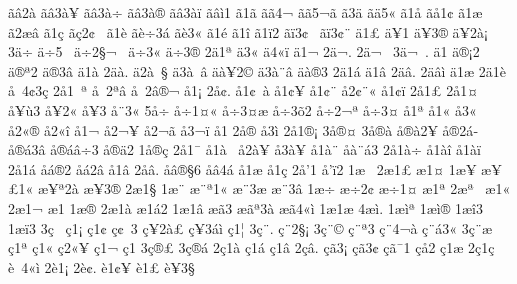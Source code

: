 {^^e3^^e22^^e0
^^e3^^e23^^e0^^a5
^^e3^^e23^^e0^^f7
^^e3^^e23^^e0^^ae
^^e3^^e23^^e0^^ef
^^e3^^e2^^ec1
^^e31^^e3
^^e3^^e34^^ac^^ad
^^e3^^e35^^ac^^e3
^^e33^^e4
^^e3^^e45^^ab
^^e31^^e5
^^e3^^e51^^a2
^^e31^^e6
^^e32^^e6^^e2
^^e31^^e7
^^e3^^e72^^a2^^a0
^^e31^^e8
^^e3^^e8^^f73^^e1
^^e3^^e83^^ab
^^e31^^e9
^^e31^^ee
^^e31^^ef2
^^e3^^ef3^^a2^^a0
^^e3^^ef3^^a2^^a8
^^e41^^a3
^^e4^^a51
^^e4^^a53^^ae
^^e4^^a52^^e0^^a1
3^^e4^^f7
^^e4^^f75^^a0
^^e4^^f72^^a7^^ac^^a0
^^e4^^f73^^ab
^^e4^^f73^^ae
2^^e41^^aa
^^e43^^ab
^^e44^^ab^^ef
^^e41^^ac
2^^e4^^ac.
2^^e4^^ac^^a0
3^^e4^^ac^^a0.
^^e41^^ad
^^e4^^ae^^a12
^^e4^^ae^^aa2
^^e4^^ae3^^ad^^e2
^^e41^^e0
2^^e4^^e0.
^^e42^^e0^^a0^^a7
^^e43^^e0^^a0^^e2
^^e4^^e0^^a52^^a9
^^e43^^e0^^a8^^e2
^^e4^^e0^^ae3
2^^e41^^e1
^^e41^^e2
2^^e4^^e2.
2^^e4^^e2^^ec
^^e41^^e6
2^^e41^^e8
^^e5^^a04^^a23^^e7
2^^e51^^a0^^aa
^^e5^^a02^^aa^^e2
^^e5^^a02^^e2^^ae^^ac
^^e51^^a1
2^^e5^^a2.
^^e51^^a2^^a0^^e0
^^e51^^a2^^a5
^^e51^^a2^^a8
^^e52^^a2^^a8^^ab
^^e51^^a2^^ef
2^^e51^^a3
2^^e51^^a4
^^e5^^a5^^f93
^^e5^^a52^^ab
^^e5^^a53^^ad
^^e5^^a83^^ab
5^^e5^^f7
^^e5^^f71^^a4^^ab
^^e5^^f73^^a4^^e6
^^e5^^f73^^f52
^^e5^^f72^^ac^^aa
^^e5^^f73^^ad^^a4
^^e51^^aa
^^e51^^ab
^^e53^^ab^^a0
^^e52^^ab^^ae
^^e52^^ab^^ee
^^e51^^ac
^^e52^^ac^^a5
^^e52^^ac^^e3
^^e53^^ac^^ef
^^e51^^ad
2^^e5^^ad^^ae
^^e53^^ad^^ec
2^^e51^^ae^^a1
3^^e5^^ae^^a4
3^^e5^^ae^^e0
^^e5^^ae^^e02^^a5
^^e5^^ae2^^e1^^ad
^^e5^^ae^^e13^^e2
^^e5^^ae^^e1^^e2^^f73
^^e5^^ae^^e42
1^^e5^^ae^^e7
2^^e51^^af
^^e51^^e0^^a0
^^e52^^e0^^a5
^^e53^^e0^^a5^^ad
^^e51^^e0^^a8
^^e5^^e0^^a8^^e13
2^^e51^^e0^^f7
^^e51^^e0^^ee
^^e51^^e0^^ef
2^^e51^^e1
^^e5^^e1^^ae2
^^e5^^e12^^e2
^^e51^^e2
2^^e5^^e2.
^^e5^^e2^^ae^^a76
^^e5^^e24^^e1
^^e51^^e6
^^e51^^e7
2^^e5'1
^^e5'^^ef2
1^^e6^^a0
2^^e61^^a3
^^e61^^a4
1^^e6^^a5
^^e6^^a5^^a31^^ab
^^e6^^a5^^aa2^^e0
^^e6^^a53^^ae
2^^e61^^a7
1^^e6^^a8
^^e6^^a8^^aa1^^ab
^^e6^^a83^^ad^^e6
^^e6^^a83^^e2
1^^e6^^f7
^^e6^^f72^^a2^^ad
^^e6^^f71^^a4
^^e61^^aa
2^^e6^^aa^^a0
^^e61^^ab
2^^e61^^ac
^^e61^^ad
1^^e6^^ae
2^^e61^^e0
^^e61^^e12
1^^e61^^e2
^^e6^^e33
^^e6^^e3^^aa3^^e0
^^e6^^e34^^ab^^ec
1^^e61^^e6
4^^e6^^ec.
1^^e6^^ec^^aa
1^^e6^^ec^^ae
1^^e6^^ee3
1^^e6^^ef3
3^^e7^^a0^^ad
^^e71^^a1
^^e71^^a2
^^e7^^a2^^a03
^^e7^^a52^^e0^^a3
^^e7^^a53^^e1^^ec
^^e71^^a6
3^^e7^^a8.
^^e7^^a82^^a7^^a1
3^^e7^^a8^^a9
^^e7^^a8^^aa3
^^e7^^a84^^ac^^e0
^^e7^^a8^^e13^^ab
3^^e7^^a8^^e6
^^e71^^aa
^^e71^^ab
^^e72^^ab^^a5
^^e71^^ac
^^e71^^ad
3^^e7^^ae^^a3
3^^e7^^ae^^e1
2^^e71^^e0
^^e71^^e1
^^e71^^e2
2^^e7^^e2.
^^e7^^e33^^a1
^^e7^^e33^^a2
^^e7^^e3^^af1
^^e7^^e52
^^e71^^e6
2^^e71^^e7
^^e8^^a04^^ab^^ec
2^^e81^^a1
2^^e8^^a2.
^^e81^^a2^^a5
^^e81^^a3
^^e8^^a53^^a7
}
